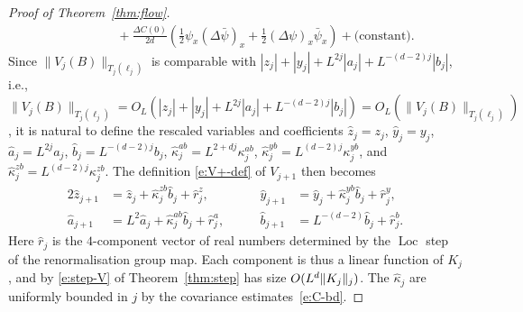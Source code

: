 \documentclass[11pt]{amsart}
\numberwithin{equation}{section}
\numberwithin{theorem}{section}
\newcommand{\1}{{\bf 1}}
\newcommand{\OL}{O_L}
\newcommand{\Loc}{\operatorname{Loc}}
\begin{document}
\begin{proof}[Proof of Theorem~\ref{thm:flow}]
\begin{align}
      &\qquad\qquad
      +\frac{\Delta C(0)}{2d}(\frac12 \psi_x(\Delta\bar\psi)_x+\frac12 (\Delta\psi)_x\bar\psi_x) + \text{(constant)}.
  \end{align}
  Since $\|V_j(B)\|_{T_j(\ell_j)}$ is comparable with
  $|z_j| + |y_j| + L^{2j}|a_j| + L^{-(d-2)j} |b_j|$, i.e.,
  $\|V_j(B)\|_{T_j(\ell_j)} = \OL(|z_j| + |y_j| + L^{2j}|a_j| + L^{-(d-2)j} |b_j|) = \OL(\|V_j(B)\|_{T_j(\ell_j)})$,
  it is natural to define the rescaled variables and coefficients
  $\hat z_{j}=z_{j}$, $\hat y_{j}=y_{j}$,
  $\hat a_{j}=L^{2j}a_{j}$, $\hat b_{j}=L^{-(d-2)j}b_{j}$,
  $\hat \kappa_{j}^{ab}=L^{2+dj}\kappa_{j}^{ab}$,
  $\hat \kappa_{j}^{yb}=L^{(d-2)j}\kappa_{j}^{yb}$,
  and $\hat\kappa_j^{zb}=L^{(d-2)j}\kappa_j^{zb}$.
  The definition \eqref{e:V+-def} of $V_{j+1}$ then becomes
  \begin{alignat}{2}
    \label{eq:flow1}
    \hat z_{j+1} &= \hat z_{j} + \hat\kappa_j^{zb}\hat b_j
    +   \hat r^{z}_{j},
    &\qquad
    \hat y_{j+1}&= \hat y_{j} + \hat\kappa_{j}^{yb}\hat b_{j} + \hat
    r^{y}_{j}, \\
    \label{eq:flow2}
    \hat a_{j+1}&= L^{2}\hat a_{j} + \hat\kappa_{j}^{ab}\hat b_{j} + \hat r^{a}_{j}, &\qquad
    \hat b_{j+1}&= L^{-(d-2)}\hat b_{j} + \hat r^{b}_{j}.
  \end{alignat}
  Here $\hat r_{j}$ is the $4$-component vector of real numbers determined by the $\Loc$ step of the renormalisation group map.
  Each component is thus a linear function of $K_j$, and by
  \eqref{e:step-V} of Theorem~\ref{thm:step} has size
  $O(L^{d}\lVert K_{j} \rVert_{j})$.  The $\hat \kappa_{j}$ 
  are uniformly bounded in $j$ by the covariance estimates~\eqref{e:C-bd}.


\end{proof}
\end{document}
